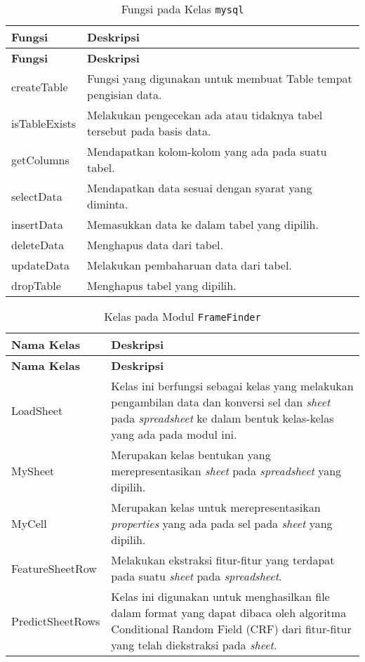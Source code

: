 \begin{small}
\begin{longtable}{ | p{2cm} | p{10cm} | }
    \caption{Fungsi pada Kelas \texttt{mysql}}
    \label{FungsiModulDB}\\ \hline
    \centering\bfseries{Fungsi} & \centering\bfseries{Deskripsi} \tabularnewline \hline
    \endfirsthead
    \hline
    \centering\bfseries{Fungsi} & \centering\bfseries{Deskripsi} \tabularnewline \hline
    \endhead
    createTable & Fungsi yang digunakan untuk membuat Table tempat pengisian data.\\ \hline
    isTableExists & Melakukan pengecekan ada atau tidaknya tabel tersebut pada basis data.\\ \hline
    getColumns & Mendapatkan kolom-kolom yang ada pada suatu tabel.\\ \hline
    selectData & Mendapatkan data sesuai dengan syarat yang diminta.\\ \hline
    insertData & Memasukkan data ke dalam tabel yang dipilih.\\ \hline
    deleteData & Menghapus data dari tabel.\\ \hline
    updateData & Melakukan pembaharuan data dari tabel.\\ \hline
    dropTable & Menghapus tabel yang dipilih.\\ \hline
\end{longtable}
\end{small}

\begin{small}
\begin{longtable}{ | p{3cm} | p{10cm} | }
    \caption{Kelas pada Modul \texttt{FrameFinder}}
    \label{KelasModulFF}\\ \hline
    \centering\bfseries{Nama Kelas} & \centering\bfseries{Deskripsi} \tabularnewline \hline
    \endfirsthead
    \hline
    \centering\bfseries{Nama Kelas} & \centering\bfseries{Deskripsi} \tabularnewline \hline
    \endhead
    LoadSheet & Kelas ini berfungsi sebagai kelas yang melakukan pengambilan data dan konversi sel dan \textit{sheet} pada \textit{spreadsheet} ke dalam bentuk kelas-kelas yang ada pada modul ini.\\ \hline
    MySheet & Merupakan kelas bentukan yang merepresentasikan \textit{sheet} pada \textit{spreadsheet} yang dipilih.\\ \hline
    MyCell & Merupakan kelas untuk merepresentasikan \textit{properties} yang ada pada sel pada \textit{sheet} yang dipilih.\\ \hline
    FeatureSheetRow & Melakukan ekstraksi fitur-fitur yang terdapat pada suatu \textit{sheet} pada \textit{spreadsheet}.\\ \hline
    PredictSheetRows & Kelas ini digunakan untuk menghasilkan file dalam format yang dapat dibaca oleh algoritma Conditional Random Field (CRF) dari fitur-fitur yang telah diekstraksi pada \textit{sheet}.\\ \hline
\end{longtable}
\end{small}

